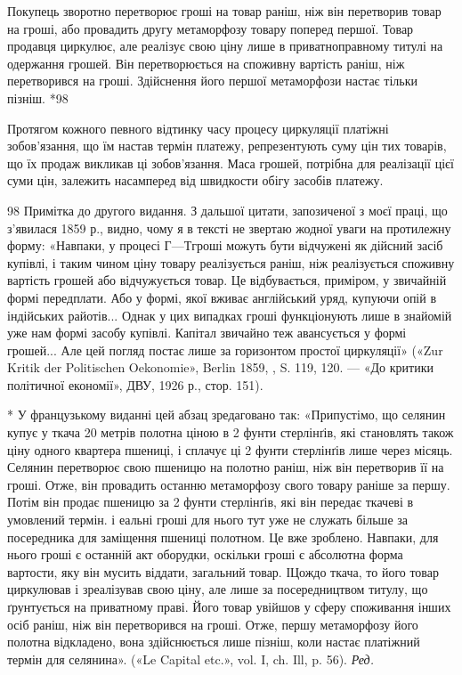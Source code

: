 Покупець зворотно перетворює гроші на товар раніш, ніж він перетворив товар на гроші, або провадить
другу метаморфозу товару поперед першої. Товар продавця циркулює, але реалізує свою ціну лише в
приватноправному титулі на одержання
грошей. Він перетворюється на споживну вартість раніш, ніж перетворився на гроші. Здійснення його
першої метаморфози настає тільки пізніш. *98

Протягом кожного певного відтинку часу процесу циркуляції платіжні зобов’язання, що їм настав термін
платежу, репрезентують суму цін тих товарів, що їх продаж викликав ці зобов’язання. Маса грошей,
потрібна для реалізації цієї суми цін,
залежить насамперед від швидкости обігу засобів платежу.

98 Примітка до другого видання. З дальшої цитати, запозиченої з моєї праці, що з’явилася 1859 р.,
видно, чому я в тексті не звертаю жодної уваги на протилежну форму: «Навпаки, у процесі $Г — Т г$роші
можуть бути відчужені як дійсний засіб купівлі, і таким чином ціну товару реалізується раніш, ніж
реалізується споживну вартість грошей або відчужується товар. Це відбувається, приміром, у звичайній
формі передплати. Або у формі, якої вживає англійський уряд, купуючи опій в індійських райотів...
Однак у цих випадках гроші функціонують лише в знайомій
уже нам формі засобу купівлі. Капітал звичайно теж авансується у формі грошей... Але цей погляд
постає лише за горизонтом простої циркуляції» («Zur Kritik der Politischen Oekonomie», Berlin 1859,
, S. 119, 120. — «До критики політичної економії», ДВУ, 1926 р., стор. 151).

*  У французькому виданні цей абзац зредаговано так: «Припустімо, що селянин купує у ткача 20 метрів
полотна ціною в 2 фунти стерлінґів, які становлять також ціну одного квартера пшениці, і сплачує ці
2 фунти стерлінґів лише через місяць. Селянин перетворює свою пшеницю на полотно раніш, ніж він
перетворив її на гроші. Отже, він провадить останню метаморфозу свого товару раніше за першу. Потім
він продає
пшеницю за 2 фунти стерлінґів, які він передає ткачеві в умовлений термін. і еальні гроші для нього
тут уже не служать більше за посередника для заміщення пшениці полотном. Це вже зроблено. Навпаки,
для нього гроші є останній акт оборудки, оскільки гроші є абсолютна форма вартости, яку він мусить
віддати, загальний товар. ІЦождо ткача, то його товар циркулював і зреалізував свою ціну, але лише
за посередництвом титулу, що ґрунтується на приватному праві. Його товар увійшов у сферу споживання
інших осіб раніш, ніж він перетворився на гроші. Отже, першу метаморфозу його полотна відкладено,
вона здійснюється лише пізніш, коли настає платіжний термін для селянина». («Le Capital etc.», vol.
I, ch. Ill, p. 56). \emph{Ред.}
\parbreak{}  %
